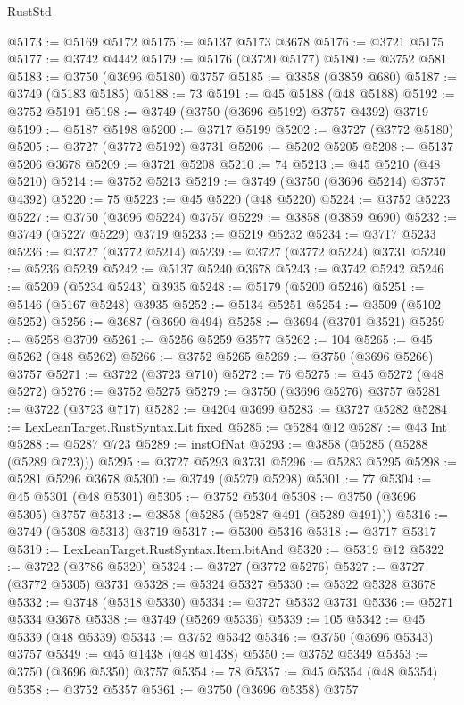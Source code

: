 \begin{lexlean}{RustStd}
\begin{coremodule}
@5173 := @5169 @5172
@5175 := @5137 @5173 @3678
@5176 := @3721 @5175
@5177 := @3742 @4442
@5179 := @5176 (@3720 @5177)
@5180 := @3752 @581
@5183 := @3750 (@3696 @5180) @3757
@5185 := @3858 (@3859 @680)
@5187 := @3749 (@5183 @5185)
@5188 := 73
@5191 := @45 @5188 (@48 @5188)
@5192 := @3752 @5191
@5198 := @3749 (@3750 (@3696 @5192) @3757 @4392) @3719
@5199 := @5187 @5198
@5200 := @3717 @5199
@5202 := @3727 (@3772 @5180)
@5205 := @3727 (@3772 @5192) @3731
@5206 := @5202 @5205
@5208 := @5137 @5206 @3678
@5209 := @3721 @5208
@5210 := 74
@5213 := @45 @5210 (@48 @5210)
@5214 := @3752 @5213
@5219 := @3749 (@3750 (@3696 @5214) @3757 @4392)
@5220 := 75
@5223 := @45 @5220 (@48 @5220)
@5224 := @3752 @5223
@5227 := @3750 (@3696 @5224) @3757
@5229 := @3858 (@3859 @690)
@5232 := @3749 (@5227 @5229) @3719
@5233 := @5219 @5232
@5234 := @3717 @5233
@5236 := @3727 (@3772 @5214)
@5239 := @3727 (@3772 @5224) @3731
@5240 := @5236 @5239
@5242 := @5137 @5240 @3678
@5243 := @3742 @5242
@5246 := @5209 (@5234 @5243) @3935
@5248 := @5179 (@5200 @5246)
@5251 := @5146 (@5167 @5248) @3935
@5252 := @5134 @5251
@5254 := @3509 (@5102 @5252)
@5256 := @3687 (@3690 @494)
@5258 := @3694 (@3701 @3521)
@5259 := @5258 @3709
@5261 := @5256 @5259 @3577
@5262 := 104
@5265 := @45 @5262 (@48 @5262)
@5266 := @3752 @5265
@5269 := @3750 (@3696 @5266) @3757
@5271 := @3722 (@3723 @710)
@5272 := 76
@5275 := @45 @5272 (@48 @5272)
@5276 := @3752 @5275
@5279 := @3750 (@3696 @5276) @3757
@5281 := @3722 (@3723 @717)
@5282 := @4204 @3699
@5283 := @3727 @5282
@5284 := LexLeanTarget.RustSyntax.Lit.fixed
@5285 := @5284 @12
@5287 := @43 Int
@5288 := @5287 @723
@5289 := instOfNat
@5293 := @3858 (@5285 (@5288 (@5289 @723)))
@5295 := @3727 @5293 @3731
@5296 := @5283 @5295
@5298 := @5281 @5296 @3678
@5300 := @3749 (@5279 @5298)
@5301 := 77
@5304 := @45 @5301 (@48 @5301)
@5305 := @3752 @5304
@5308 := @3750 (@3696 @5305) @3757
@5313 := @3858 (@5285 (@5287 @491 (@5289 @491)))
@5316 := @3749 (@5308 @5313) @3719
@5317 := @5300 @5316
@5318 := @3717 @5317
@5319 := LexLeanTarget.RustSyntax.Item.bitAnd
@5320 := @5319 @12
@5322 := @3722 (@3786 @5320)
@5324 := @3727 (@3772 @5276)
@5327 := @3727 (@3772 @5305) @3731
@5328 := @5324 @5327
@5330 := @5322 @5328 @3678
@5332 := @3748 (@5318 @5330)
@5334 := @3727 @5332 @3731
@5336 := @5271 @5334 @3678
@5338 := @3749 (@5269 @5336)
@5339 := 105
@5342 := @45 @5339 (@48 @5339)
@5343 := @3752 @5342
@5346 := @3750 (@3696 @5343) @3757
@5349 := @45 @1438 (@48 @1438)
@5350 := @3752 @5349
@5353 := @3750 (@3696 @5350) @3757
@5354 := 78
@5357 := @45 @5354 (@48 @5354)
@5358 := @3752 @5357
@5361 := @3750 (@3696 @5358) @3757

\end{coremodule}
\end{lexlean}
